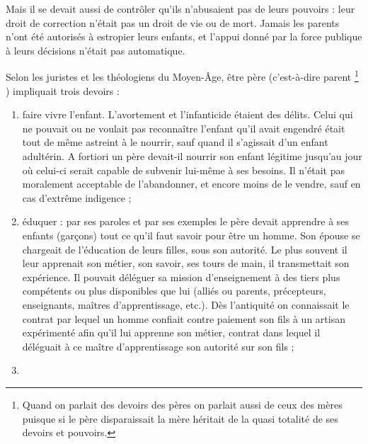  Mais il se devait aussi de contrôler qu'ils n'abusaient pas de leurs pouvoirs : leur droit de correction n'était pas un droit de vie ou de mort. Jamais les parents n'ont été autorisés à estropier leurs enfants, et l'appui donné par la force publique à leurs décisions n'était pas automatique.

 Selon les juristes et les théologiens du Moyen-Âge, être père (c'est-à-dire parent%
\footnote{Quand on parlait des devoirs des pères on parlait aussi de ceux des mères puisque si le père disparaissait la mère héritait de la quasi totalité de ses devoirs et pouvoirs.}%
) impliquait trois devoirs : 
\begin{enumerate}
\item %
faire vivre l'enfant. L'avortement et l'infanticide étaient des délits. Celui qui ne pouvait ou ne voulait pas reconnaître l'enfant qu'il avait engendré était tout de même astreint à le nourrir, sauf quand il s'agissait d'un enfant adultérin. A fortiori un père devait-il nourrir son enfant légitime jusqu'au jour où celui-ci serait capable de subvenir lui-même à ses besoins. Il n'était pas moralement acceptable de l'abandonner, et encore moins de le vendre, sauf en cas d'extrême indigence ;
\item %
éduquer : par ses paroles et par ses exemples le père devait apprendre à ses enfants (garçons) tout ce qu'il faut savoir pour être un homme. Son épouse se chargeait de l'éducation de leurs filles, sous son autorité. Le plus souvent il leur apprenait son métier, son savoir, ses tours de main, il transmettait son expérience. Il pouvait déléguer sa mission d'enseignement à des tiers plus compétents ou plus disponibles que lui (alliés ou parents, précepteurs, enseignants, maîtres d'apprentissage, etc.). Dès l'antiquité on connaissait le contrat par lequel un homme confiait contre paiement son fils à un artisan expérimenté afin qu'il lui apprenne son métier, contrat dans lequel il déléguait à ce maître d'apprentissage son autorité sur son fils ;
\item %

\end{enumerate}
